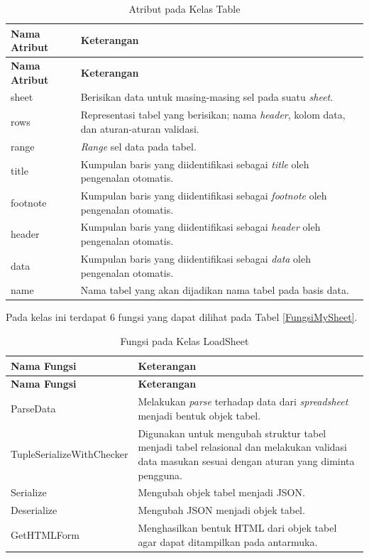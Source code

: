 	\begin{small}
	\begin{longtable}{ | p{3cm} | p{8cm} | }
	    \caption{Atribut pada Kelas Table}
	    \label{AtributTable}\\ \hline
	    \centering\bfseries{Nama Atribut} & \centering\bfseries{Keterangan} \tabularnewline \hline
	    \endfirsthead
	    \hline
	    \centering\bfseries{Nama Atribut} & \centering\bfseries{Keterangan} \tabularnewline \hline
	    \endhead
	    sheet & Berisikan data untuk masing-masing sel pada suatu \textit{sheet}.\\ \hline
	    rows & Representasi tabel yang berisikan; nama \textit{header}, kolom data, dan aturan-aturan validasi.\\ \hline
	    range & \textit{Range} sel data pada tabel.\\ \hline
	    title & Kumpulan baris yang diidentifikasi sebagai \textit{title} oleh pengenalan otomatis.\\ \hline
	    footnote & Kumpulan baris yang diidentifikasi sebagai \textit{footnote} oleh pengenalan otomatis.\\ \hline
	    header & Kumpulan baris yang diidentifikasi sebagai \textit{header} oleh pengenalan otomatis.\\ \hline
	    data & Kumpulan baris yang diidentifikasi sebagai \textit{data} oleh pengenalan otomatis.\\ \hline
	    name & Nama tabel yang akan dijadikan nama tabel pada basis data.\\ \hline
	\end{longtable}
	\end{small}

	Pada kelas ini terdapat 6 fungsi yang dapat dilihat pada Tabel \ref{FungsiMySheet}.

	\begin{small}
	\begin{longtable}{ | p{4cm} | p{9cm} | }
	    \caption{Fungsi pada Kelas LoadSheet}
	    \label{FungsiLoadSheet}\\ \hline
	    \centering\bfseries{Nama Fungsi} & \centering\bfseries{Keterangan} \tabularnewline \hline
	    \endfirsthead
	    \hline
	    \centering\bfseries{Nama Fungsi} & \centering\bfseries{Keterangan} \tabularnewline \hline
	    \endhead
	    ParseData & Melakukan \textit{parse} terhadap data dari \textit{spreadsheet} menjadi bentuk objek tabel. \\ \hline
		TupleSerializeWithChecker & Digunakan untuk mengubah struktur tabel menjadi tabel relasional dan melakukan validasi data masukan sesuai dengan aturan yang diminta pengguna.\\ \hline
		Serialize & Mengubah objek tabel menjadi JSON.\\ \hline
		Deserialize & Mengubah JSON menjadi objek tabel.\\ \hline
		GetHTMLForm & Menghasilkan bentuk HTML dari objek tabel agar dapat ditampilkan pada antarmuka.\\ \hline
	\end{longtable}
	\end{small}

